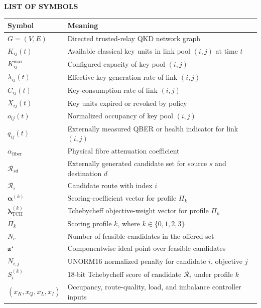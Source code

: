 \begin{center}
  {\bfseries\fontsize{16pt}{19pt}\selectfont LIST OF SYMBOLS}
\end{center}
\vspace{0.6cm}

\begin{longtable}{@{}p{}p{}@{}}
\toprule
\textbf{Symbol} & \textbf{Meaning}\\
\midrule
\endhead
$G=(V,E)$ & Directed trusted-relay QKD network graph\\
$K_{ij}(t)$ & Available classical key units in link pool $(i,j)$ at time $t$\\
$K_{ij}^{\max}$ & Configured capacity of key pool $(i,j)$\\
$\lambda_{ij}(t)$ & Effective key-generation rate of link $(i,j)$\\
$C_{ij}(t)$ & Key-consumption rate of link $(i,j)$\\
$X_{ij}(t)$ & Key units expired or revoked by policy\\
$o_{ij}(t)$ & Normalized occupancy of key pool $(i,j)$\\
$q_{ij}(t)$ & Externally measured QBER or health indicator for link $(i,j)$\\
$\alpha_{\mathrm{fiber}}$ & Physical fibre attenuation coefficient\\
$\mathcal{R}_{sd}$ & Externally generated candidate set for source $s$ and destination $d$\\
$\mathcal{R}_i$ & Candidate route with index $i$\\
$\boldsymbol{\alpha}^{(k)}$ & Scoring-coefficient vector for profile $\Pi_k$\\
$\boldsymbol{\lambda}_{\mathrm{TCH}}^{(k)}$ & Tchebycheff objective-weight vector for profile $\Pi_k$\\
$\Pi_k$ & Scoring profile $k$, where $k\in\{0,1,2,3\}$\\
$N_c$ & Number of feasible candidates in the offered set\\
$\boldsymbol z^\star$ & Componentwise ideal point over feasible candidates\\
$N_{i,j}$ & UNORM16 normalized penalty for candidate $i$, objective $j$\\
$S_i^{(k)}$ & 18-bit Tchebycheff score of candidate $\mathcal{R}_i$ under profile $k$\\
$(x_K,x_Q,x_L,x_I)$ & Occupancy, route-quality, load, and imbalance controller inputs\\

\end{longtable}
